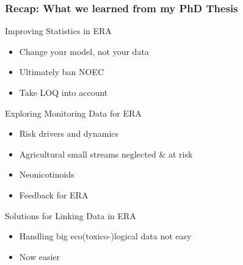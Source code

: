 \documentclass[
	10pt
	]{beamer}
\begin{document}
\begin{frame}
\frametitle{Recap: What we learned from my PhD Thesis}
	\begin{exampleblock}{\checkmark Improving Statistics in ERA}
		\begin{itemize}
			\item Change your model, not your data
			\item Ultimately ban NOEC
			\item Take LOQ into account
		\end{itemize}
	\end{exampleblock}

\pause
	\begin{exampleblock}{\checkmark Exploring Monitoring Data for ERA}
		\begin{itemize}
			\item Risk drivers and dynamics
			\item Agricultural small streams neglected \& at risk
			\item Neonicotinoids
			\item Feedback for ERA
		\end{itemize}
	\end{exampleblock}

\pause
	\begin{exampleblock}{\checkmark Solutions for Linking Data in ERA}
		\begin{itemize}
			\item Handling big eco(toxico-)logical data not easy
			\item Now easier
		\end{itemize}
	\end{exampleblock}
\end{frame}
\end{document}
